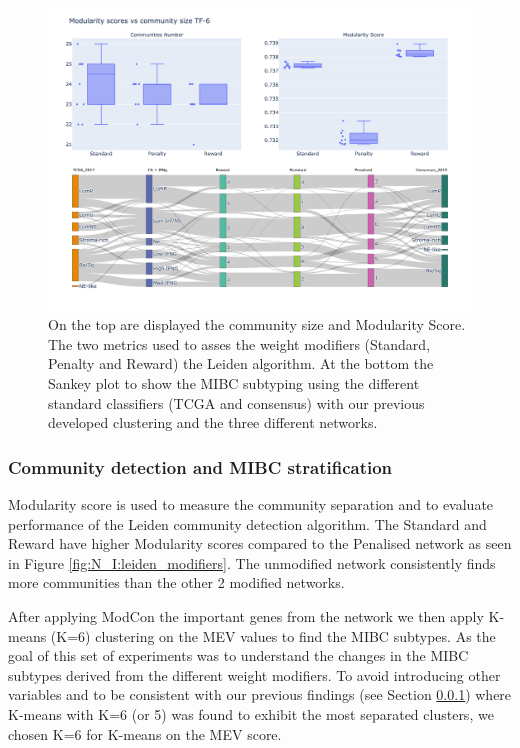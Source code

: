\begin{figure}[!htb]    \centering\includegraphics[width=1.0\textwidth,height=0.6\textheight,keepaspectratio]{Sections/Network_I/Resources/Tum_network/LeidenMetrics_Sankey_TF-6.png}
    \caption{On the top are displayed the community size and Modularity Score. The two metrics used to asses the weight modifiers (Standard, Penalty and Reward) the Leiden algorithm. At the bottom the Sankey plot to show the MIBC subtyping using the different standard classifiers (TCGA and consensus) with our previous developed clustering and the three different networks. }
    \label{fig:N_I:tum_leiden_modifiers}
\end{figure}

\subsubsection{Community detection and MIBC stratification}

Modularity score is used to measure the community separation and to evaluate performance of the Leiden community detection algorithm. The Standard and Reward have higher Modularity scores compared to the Penalised network as seen in Figure \ref{fig:N_I:leiden_modifiers}. The unmodified network consistently finds more communities than the other 2 modified networks. 


After applying ModCon the important genes from the network we then apply K-means (K=6) clustering on the MEV values to find the MIBC subtypes. As the goal of this set of experiments was to understand the changes in the MIBC subtypes derived from the different weight modifiers. To avoid introducing other variables and to be consistent with our previous findings (see Section \ref{}) where K-means with K=6 (or 5) was found to exhibit the most separated clusters, we chosen K=6 for K-means on the MEV score. 

